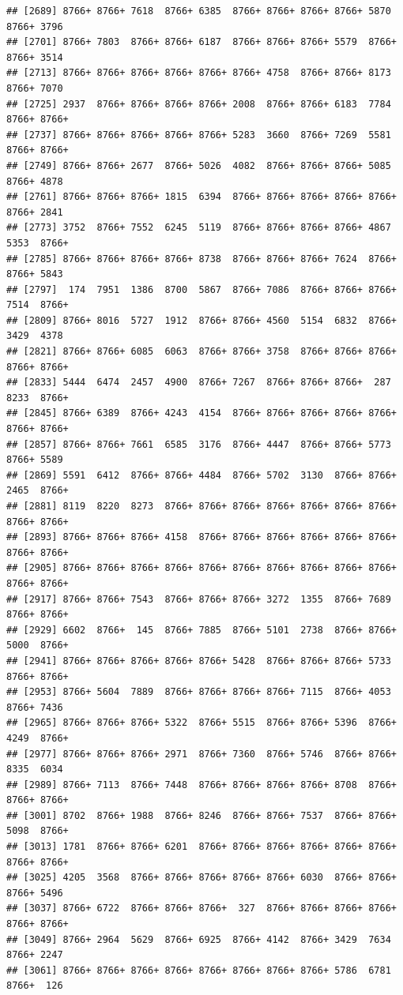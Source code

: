 \documentclass[
]{book}
\begin{document}
\begin{verbatim}
## [2689] 8766+ 8766+ 7618  8766+ 6385  8766+ 8766+ 8766+ 8766+ 5870  8766+ 3796 
## [2701] 8766+ 7803  8766+ 8766+ 6187  8766+ 8766+ 8766+ 5579  8766+ 8766+ 3514 
## [2713] 8766+ 8766+ 8766+ 8766+ 8766+ 8766+ 4758  8766+ 8766+ 8173  8766+ 7070 
## [2725] 2937  8766+ 8766+ 8766+ 8766+ 2008  8766+ 8766+ 6183  7784  8766+ 8766+
## [2737] 8766+ 8766+ 8766+ 8766+ 8766+ 5283  3660  8766+ 7269  5581  8766+ 8766+
## [2749] 8766+ 8766+ 2677  8766+ 5026  4082  8766+ 8766+ 8766+ 5085  8766+ 4878 
## [2761] 8766+ 8766+ 8766+ 1815  6394  8766+ 8766+ 8766+ 8766+ 8766+ 8766+ 2841 
## [2773] 3752  8766+ 7552  6245  5119  8766+ 8766+ 8766+ 8766+ 4867  5353  8766+
## [2785] 8766+ 8766+ 8766+ 8766+ 8738  8766+ 8766+ 8766+ 7624  8766+ 8766+ 5843 
## [2797]  174  7951  1386  8700  5867  8766+ 7086  8766+ 8766+ 8766+ 7514  8766+
## [2809] 8766+ 8016  5727  1912  8766+ 8766+ 4560  5154  6832  8766+ 3429  4378 
## [2821] 8766+ 8766+ 6085  6063  8766+ 8766+ 3758  8766+ 8766+ 8766+ 8766+ 8766+
## [2833] 5444  6474  2457  4900  8766+ 7267  8766+ 8766+ 8766+  287  8233  8766+
## [2845] 8766+ 6389  8766+ 4243  4154  8766+ 8766+ 8766+ 8766+ 8766+ 8766+ 8766+
## [2857] 8766+ 8766+ 7661  6585  3176  8766+ 4447  8766+ 8766+ 5773  8766+ 5589 
## [2869] 5591  6412  8766+ 8766+ 4484  8766+ 5702  3130  8766+ 8766+ 2465  8766+
## [2881] 8119  8220  8273  8766+ 8766+ 8766+ 8766+ 8766+ 8766+ 8766+ 8766+ 8766+
## [2893] 8766+ 8766+ 8766+ 4158  8766+ 8766+ 8766+ 8766+ 8766+ 8766+ 8766+ 8766+
## [2905] 8766+ 8766+ 8766+ 8766+ 8766+ 8766+ 8766+ 8766+ 8766+ 8766+ 8766+ 8766+
## [2917] 8766+ 8766+ 7543  8766+ 8766+ 8766+ 3272  1355  8766+ 7689  8766+ 8766+
## [2929] 6602  8766+  145  8766+ 7885  8766+ 5101  2738  8766+ 8766+ 5000  8766+
## [2941] 8766+ 8766+ 8766+ 8766+ 8766+ 5428  8766+ 8766+ 8766+ 5733  8766+ 8766+
## [2953] 8766+ 5604  7889  8766+ 8766+ 8766+ 8766+ 7115  8766+ 4053  8766+ 7436 
## [2965] 8766+ 8766+ 8766+ 5322  8766+ 5515  8766+ 8766+ 5396  8766+ 4249  8766+
## [2977] 8766+ 8766+ 8766+ 2971  8766+ 7360  8766+ 5746  8766+ 8766+ 8335  6034 
## [2989] 8766+ 7113  8766+ 7448  8766+ 8766+ 8766+ 8766+ 8708  8766+ 8766+ 8766+
## [3001] 8702  8766+ 1988  8766+ 8246  8766+ 8766+ 7537  8766+ 8766+ 5098  8766+
## [3013] 1781  8766+ 8766+ 6201  8766+ 8766+ 8766+ 8766+ 8766+ 8766+ 8766+ 8766+
## [3025] 4205  3568  8766+ 8766+ 8766+ 8766+ 8766+ 6030  8766+ 8766+ 8766+ 5496 
## [3037] 8766+ 6722  8766+ 8766+ 8766+  327  8766+ 8766+ 8766+ 8766+ 8766+ 8766+
## [3049] 8766+ 2964  5629  8766+ 6925  8766+ 4142  8766+ 3429  7634  8766+ 2247 
## [3061] 8766+ 8766+ 8766+ 8766+ 8766+ 8766+ 8766+ 8766+ 5786  6781  8766+  126 

\end{verbatim}
\end{document}

